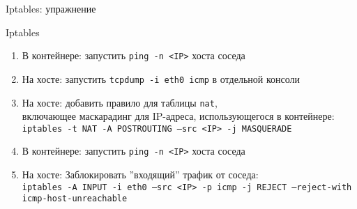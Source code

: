 \begin{frame}{Iptables: упражнение}
    \begin{block}{Iptables}
        \begin{enumerate}
            \item В контейнере: запустить {\tt ping -n <IP>} хоста соседа
            \item На хосте: запустить {\tt tcpdump -i eth0 icmp} в отдельной консоли
            \item На хосте: добавить правило для таблицы {\tt nat},\\
                включающее маскарадинг для IP-адреса, использующегося в контейнере: \\
                {\tt iptables -t NAT -A POSTROUTING --src <IP> -j MASQUERADE}
            \item В контейнере: запустить {\tt ping -n <IP>} хоста соседа
            \item На хосте: Заблокировать ''входящий'' трафик от соседа:\\
                {\tt iptables -A INPUT -i eth0 --src <IP> -p icmp -j REJECT --reject-with icmp-host-unreachable}
        \end{enumerate}
    \end{block}
\end{frame}
